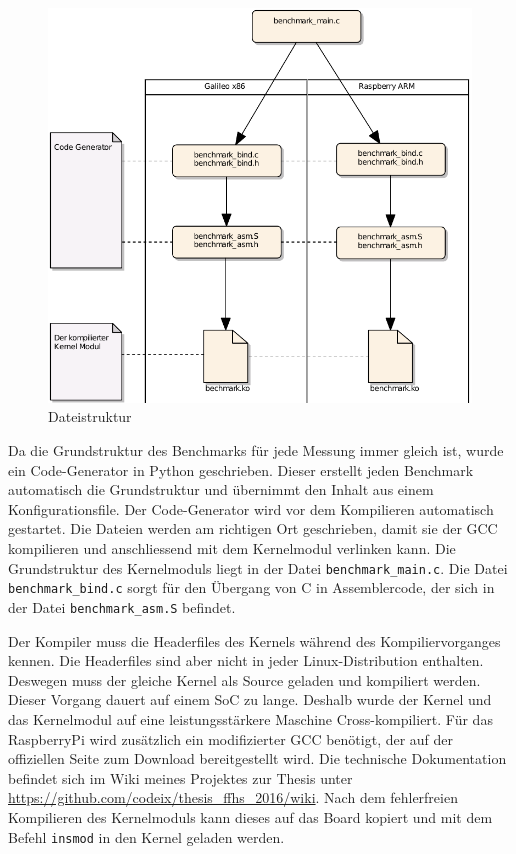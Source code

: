 \begin{figure}
\centering
\includegraphics[scale=0.8]{images/filestructure.pdf}
\caption{Dateistruktur}
\label{fig:filestructure}
\end{figure}


Da die Grundstruktur des Benchmarks für jede Messung immer gleich ist, wurde ein Code-Generator in Python geschrieben. Dieser erstellt jeden Benchmark automatisch die Grundstruktur und übernimmt den Inhalt aus einem Konfigurationsfile. Der Code-Generator wird vor dem Kompilieren automatisch gestartet. Die Dateien werden am richtigen Ort geschrieben, damit sie der GCC kompilieren und anschliessend mit dem Kernelmodul verlinken kann. Die Grundstruktur des Kernelmoduls liegt in der Datei \texttt{benchmark\_main.c}. Die Datei \texttt{benchmark\_bind.c} sorgt für den Übergang von C in Assemblercode, der sich in der Datei \texttt{benchmark\_asm.S} befindet.
\par
Der Kompiler muss die Headerfiles des Kernels während des Kompiliervorganges kennen. Die Headerfiles sind aber nicht in jeder Linux-Distribution enthalten. Deswegen muss der gleiche Kernel als Source geladen und kompiliert werden. Dieser Vorgang dauert auf einem SoC zu lange. Deshalb wurde der Kernel und das Kernelmodul auf eine leistungsstärkere Maschine Cross-kompiliert. Für das RaspberryPi wird zusätzlich ein modifizierter GCC benötigt, der auf der offiziellen Seite zum Download bereitgestellt wird. Die technische Dokumentation befindet sich im Wiki meines Projektes zur Thesis unter \url{https://github.com/codeix/thesis_ffhs_2016/wiki}. Nach dem fehlerfreien Kompilieren des Kernelmoduls kann dieses auf das Board kopiert und mit dem Befehl \texttt{insmod} in den Kernel geladen werden.


